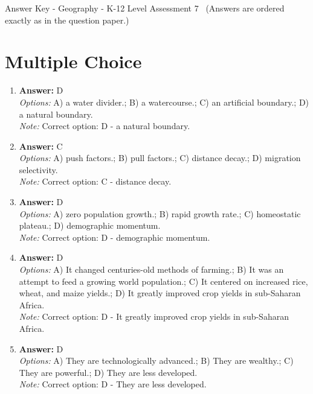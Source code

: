 \documentclass[12pt]{article}
\begin{document}
\begin{center}
Answer Key - Geography - K-12 Level Assessment 7 \
\small (Answers are ordered exactly as in the question paper.)
\end{center}

\section*{Multiple Choice}
\begin{enumerate}[label=\arabic*.]
\item \textbf{Answer:} D
\\ \textit{Options:} A) a water divider.; B) a watercourse.; C) an artificial boundary.; D) a natural boundary.
\\ \textit{Note:} Correct option: D - a natural boundary.
\item \textbf{Answer:} C
\\ \textit{Options:} A) push factors.; B) pull factors.; C) distance decay.; D) migration selectivity.
\\ \textit{Note:} Correct option: C - distance decay.
\item \textbf{Answer:} D
\\ \textit{Options:} A) zero population growth.; B) rapid growth rate.; C) homeostatic plateau.; D) demographic momentum.
\\ \textit{Note:} Correct option: D - demographic momentum.
\item \textbf{Answer:} D
\\ \textit{Options:} A) It changed centuries-old methods of farming.; B) It was an attempt to feed a growing world population.; C) It centered on increased rice, wheat, and maize yields.; D) It greatly improved crop yields in sub-Saharan Africa.
\\ \textit{Note:} Correct option: D - It greatly improved crop yields in sub-Saharan Africa.
\item \textbf{Answer:} D
\\ \textit{Options:} A) They are technologically advanced.; B) They are wealthy.; C) They are powerful.; D) They are less developed.
\\ \textit{Note:} Correct option: D - They are less developed.
\end{enumerate}
\end{document}
